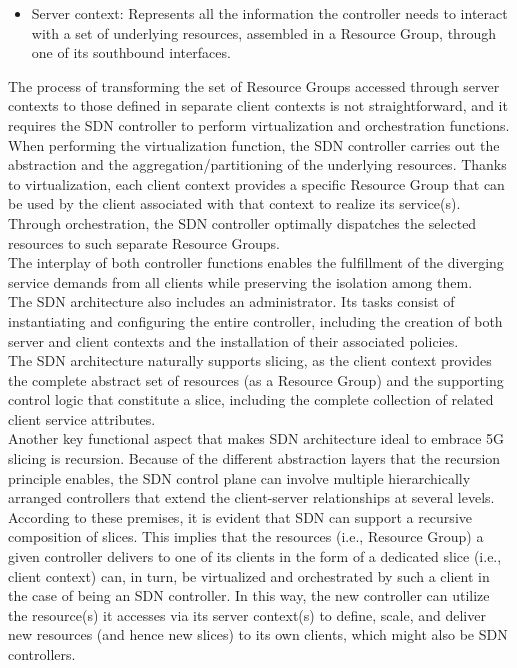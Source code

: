 \documentclass{report}
\begin{document}
\begin{itemize}
\item Server context: Represents all the information the controller needs to interact with a set of
underlying resources, assembled in a Resource
Group, through one of its southbound interfaces.
\end{itemize}
The process of transforming the set of
Resource Groups accessed through server contexts to those defined in separate client contexts
is not straightforward, and it requires the SDN
controller to perform virtualization and orchestration functions.\\
When performing the virtualization function, the
SDN controller carries out the abstraction and the
aggregation/partitioning of the underlying resources. Thanks to virtualization, each client context provides a specific Resource Group that can be used by the client associated with that context to realize
its service(s). Through orchestration, the SDN controller optimally dispatches the selected resources
to such separate Resource Groups. \\
The interplay of both controller functions enables the fulfillment
of the diverging service demands from all clients
while preserving the isolation among them.\\
The SDN architecture also includes an administrator. Its tasks consist of instantiating and configuring the entire controller, including the creation
of both server and client contexts and the installation of their associated policies.\\
The SDN architecture naturally supports slicing, as the client context provides the complete abstract set of resources
(as a Resource Group) and the supporting control
logic that constitute a slice, including the complete
collection of related client service attributes.\\
Another key functional aspect that makes SDN
architecture ideal to embrace 5G slicing is recursion. Because of the different abstraction layers
that the recursion principle enables, the SDN
control plane can involve multiple hierarchically
arranged controllers that extend the client-server
relationships at several levels. According to
these premises, it is evident that SDN can support a
recursive composition of slices. This implies that
the resources (i.e., Resource Group) a given controller delivers to one of its clients in the form of a
dedicated slice (i.e., client context) can, in turn, be
virtualized and orchestrated by such a client in the
case of being an SDN controller. In this way, the new
controller can utilize the resource(s) it accesses via
its server context(s) to define, scale, and deliver
new resources (and hence new slices) to its own
clients, which might also be SDN controllers.
\end{document}
